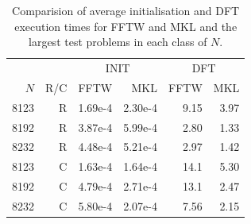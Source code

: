 \documentclass[12pt, a4paper]{article} \setlength{\textheight}{24cm}
\begin{document}
\begin{table}[H]
  \captionsetup{width=0.8\linewidth}
  \centering
  \begin{tabular}{|rr|rr|rr|}
    \hline
    \multicolumn{2}{|c|}{ }& \multicolumn{2}{|c|}{INIT } & \multicolumn{2}{|c|}{DFT }  \\
     $N$ & R/C & FFTW & MKL & FFTW & MKL \\
    \hline
    \hline
    8123 & R & 1.69e-4 & 2.30e-4 & 9.15 & 3.97 \\
    8192 & R & 3.87e-4 & 5.99e-4 &  2.80 & 1.33  \\ 
    8232 & R & 4.48e-4 & 5.21e-4 & 2.97 & 1.42 \\  
\hline
    8123 & C & 1.63e-4 & 1.64e-4 & 14.1 & 5.30 \\
    8192 & C & 4.79e-4 & 2.71e-4 & 13.1 & 2.47 \\
    8232 & C & 5.80e-4 & 2.07e-4 & 7.56 & 2.15 \\
\hline
  \end{tabular}
  \caption{Comparision of average initialisation and DFT execution times for FFTW and MKL and the largest test problems in each class of $N.$}\label{Tbl:2D}
\end{table}
\end{document}
